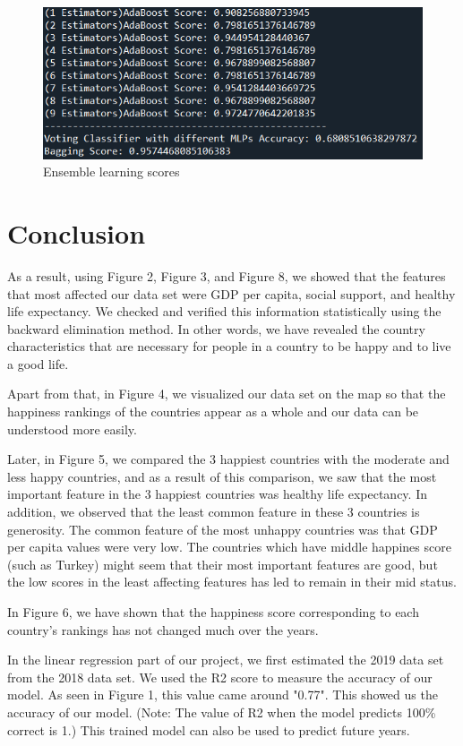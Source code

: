 \documentclass[onecolumn]{article}
\begin{document}
\begin{figure}[htp]
\centering
\includegraphics[scale=0.60]{ensembleLearning.png}
\caption{Ensemble learning scores}
\end{figure}






\clearpage
\section{Conclusion}
As a result, using Figure 2, Figure 3, and Figure 8, we showed that the features that most affected our data set were GDP per capita, social support, and healthy life expectancy. We checked and verified this information statistically using the backward elimination method. In other words, we have revealed the country characteristics that are necessary for people in a country to be happy and to live a good life.

Apart from that, in Figure 4, we visualized our data set on the map so that the happiness rankings of the countries appear as a whole and our data can be understood more easily.

Later, in Figure 5, we compared the 3 happiest countries with the moderate and less happy countries, and as a result of this comparison, we saw that the most important feature in the 3 happiest countries was healthy life expectancy. In addition, we observed that the least common feature in these 3 countries is generosity. The common feature of the most unhappy countries was that GDP per capita values were very low. The countries which have middle happines score (such as Turkey) might seem that their most important features are good, but the low scores in the least affecting features has led to remain in their mid status.

In Figure 6, we have shown that the happiness score corresponding to each country's rankings has not changed much over the years.

In the linear regression part of our project, we first estimated the 2019 data set from the 2018 data set. We used the R2 score to measure the accuracy of our model. As seen in Figure 1, this value came around "0.77". This showed us the accuracy of our model. (Note: The value of R2 when the model predicts 100\% correct is 1.) This trained model can also be used to predict future years.
\end{document}
